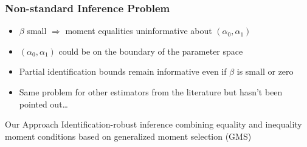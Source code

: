 \documentclass{beamer}
\begin{document}
\begin{frame}
  \frametitle{Non-standard Inference Problem}

\begin{itemize}
  \item $\beta$ small $\Rightarrow$ moment equalities uninformative about $(\alpha_0, \alpha_1)$
  \item $(\alpha_0, \alpha_1)$ could be on the boundary of the parameter space
  \item Partial identification bounds remain informative even if $\beta$ is small or zero
  \item Same problem for other estimators from the literature but hasn't been pointed out\ldots
\end{itemize}

\begin{alertblock}{Our Approach}
 Identification-robust inference combining equality and inequality moment conditions based on generalized moment selection (GMS)
\end{alertblock}

\end{frame}

\end{document}
